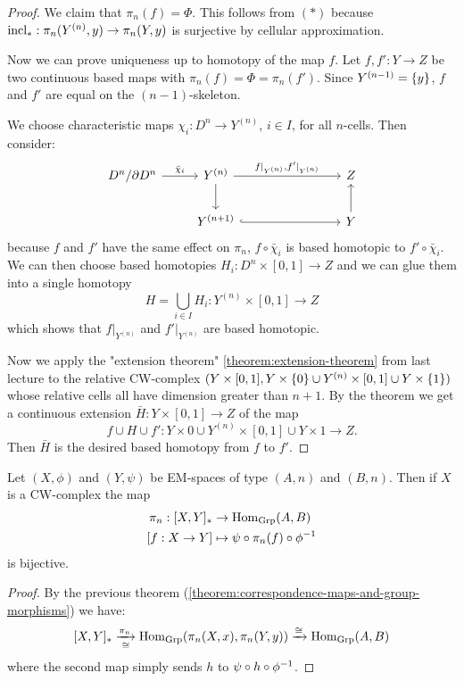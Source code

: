 \begin{proof}
We claim that $\pi_n(f)=\Phi$. This follows from $(*)$ because $\operatorname{incl}_*:\pi_n(Y^{(n)},y)\to\pi_n(Y,y)$ is surjective by cellular approximation.

Now we can prove uniqueness up to homotopy of the map $f$. Let $f,f':Y\to Z$ be two continuous based maps with $\pi_n(f)=\Phi=\pi_n(f')$. Since $Y^{({n-1})}=\{y\}$, $f$ and $f'$ are equal on the $(n-1)$-skeleton.

We choose characteristic maps $\chi_i:D^n\to Y^{(n)}$, $i\in I$, for all $n$-cells. Then consider:
\[
\begin{tikzcd}
D^n/\de D^n \ar[r,"\bar\chi_i"] & Y^{(n)} \ar[d] \ar[r,"{f|_{Y^{(n)}},f'|_{Y^{(n)}}}"] &[20mm] Z\\
& Y^{(n+1)} \ar[r,hook] & Y \ar[u]
\end{tikzcd}
\]
because $f$ and $f'$ have the same effect on $\pi_n$, $f\circ\bar\chi_i$ is based homotopic to $f'\circ\bar\chi_i$. We can then choose based homotopies $H_i:D^n\times[0,1]\to Z$ and we can glue them into a single homotopy
\[H=\bigcup_{i\in I}H_i:Y^{(n)}\times[0,1]\to Z\]
which shows that $f|_{Y^{(n)}}$ and $f'|_{Y^{(n)}}$ are based homotopic.

Now we apply the "extension theorem" \ref{theorem:extension-theorem} from last lecture to the relative CW-complex $(Y\times[0,1],Y\times\{0\}\cup Y^{(n)}\times[0,1]\cup Y\times\{1\})$ whose relative cells all have dimension greater than $n+1$. By the theorem we get a continuous extension $\bar H:Y\times[0,1]\to Z$ of the map
\[f\cup H\cup f':Y\times0\cup Y^{(n)}\times[0,1]\cup Y\times1\to Z.\]
Then $\bar H$ is the desired based homotopy from $f$ to $f'$.
\end{proof}

\begin{theorem}\label{theorem:correspondence-maps-and-group-morphisms-EM}
Let $(X,\phi)$ and $(Y,\psi)$ be EM-spaces of type $(A,n)$ and $(B,n)$. Then if $X$ is a CW-complex the map
\begin{align*}
    \pi_n:[X,Y]_*&\to\Hom_\Grp(A,B)\\
    [f:X\to Y]&\mapsto\psi\circ\pi_n(f)\circ\phi^\inv
\end{align*}
is bijective.
\end{theorem}

\begin{proof}
By the previous theorem (\ref{theorem:correspondence-maps-and-group-morphisms}) we have:
\[
    [X,Y]_*\underset{\cong}{\xrightarrow{\pi_n}}\operatorname{Hom}_{\mathrm{Grp}}(\pi_n(X,x),\pi_n(Y,y))\xrightarrow{\cong}\operatorname{Hom}_{\mathrm{Grp}}(A,B)
\]
where the second map simply sends $h$ to $\psi\circ h\circ\phi^\inv$.
\end{proof}

